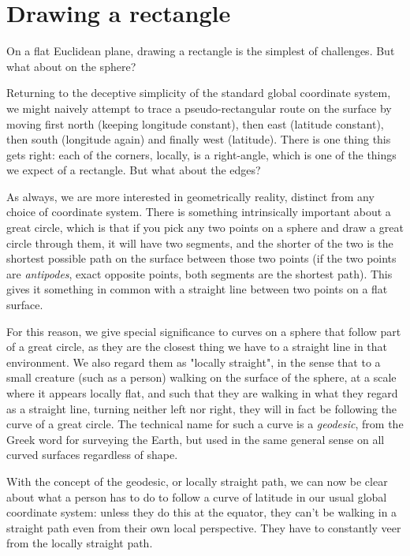 \section{Drawing a rectangle}

On a flat Euclidean plane, drawing a rectangle is the simplest of challenges. But what about on the sphere?

Returning to the deceptive simplicity of the standard global coordinate system, we might naively attempt to trace a pseudo-rectangular route on the surface by moving first north (keeping longitude constant), then east (latitude constant), then south (longitude again) and finally west (latitude). There is one thing this gets right: each of the corners, locally, is a right-angle, which is one of the things we expect of a rectangle. But what about the edges?

As always, we are more interested in geometrically reality, distinct from any choice of coordinate system. There is something intrinsically important about a great circle, which is that if you pick any two points on a sphere and draw a great circle through them, it will have two segments, and the shorter of the two is the shortest possible path on the surface between those two points (if the two points are \textit{antipodes}, exact opposite points, both segments are the shortest path). This gives it something in common with a straight line between two points on a flat surface.

For this reason, we give special significance to curves on a sphere that follow part of a great circle, as they are the closest thing we have to a straight line in that environment. We also regard them as "locally straight", in the sense that to a small creature (such as a person) walking on the surface of the sphere, at a scale where it appears locally flat, and such that they are walking in what they regard as a straight line, turning neither left nor right, they will in fact be following the curve of a great circle. The technical name for such a curve is a \textit{geodesic}, from the Greek word for surveying the Earth, but used in the same general sense on all curved surfaces regardless of shape.

With the concept of the geodesic, or locally straight path, we can now be clear about what a person has to do to follow a curve of latitude in our usual global coordinate system: unless they do this at the equator, they can't be walking in a straight path even from their own local perspective. They have to constantly veer from the locally straight path.

